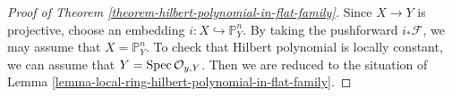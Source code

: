 \documentclass[11pt]{amsart}
\newcommand{\Spec}{{\rm Spec \,}}
\newcommand{\sF}{{\mathcal F}}
\newcommand{\sO}{{\mathcal O}}
\renewcommand{\P}{{\mathbb P}}
\theoremstyle{definition}
\begin{document}
\begin{proof}[Proof of Theorem \ref{theorem-hilbert-polynomial-in-flat-family}]
	Since $X\rightarrow Y$ is projective, choose an embedding $i:X\hookrightarrow \P_Y^n$. By taking the pushforward $i_*\sF$, we may assume that $X=\P_Y^n$. To check that Hilbert polynomial is locally constant, we can assume that $Y=\Spec \sO_{y,Y}$. Then we are reduced to the situation of Lemma \ref{lemma-local-ring-hilbert-polynomial-in-flat-family}.
\end{proof}



\newpage


\end{document}
